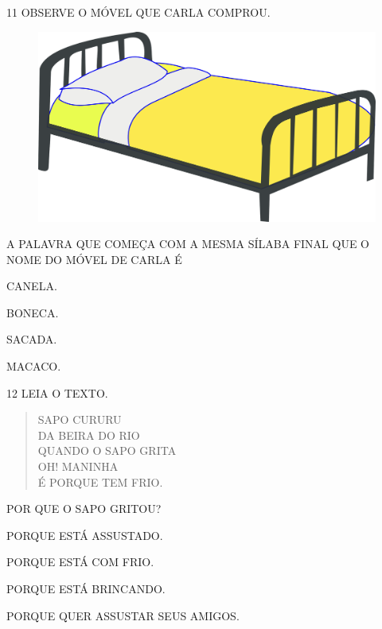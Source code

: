 
\num{11} OBSERVE O MÓVEL QUE CARLA COMPROU.

\begin{figure}[H]
\centering
\includegraphics[width=.65\textwidth]{media/image235a.png}
\end{figure}

A PALAVRA QUE COMEÇA COM A MESMA SÍLABA FINAL QUE O NOME DO MÓVEL DE CARLA É 

\begin{multicols}{2}
\begin{escolha}[itemsep=0pt]
\item CANELA.

\item BONECA.

\item SACADA.

\item MACACO.
\end{escolha}
\end{multicols}

\num{12} LEIA O TEXTO.

\begin{myquote}
\begin{verse}
SAPO CURURU\\
DA BEIRA DO RIO\\
QUANDO O SAPO GRITA\\
OH! MANINHA\\
É PORQUE TEM FRIO.
\end{verse}

\end{myquote}

POR QUE O SAPO GRITOU?

\begin{escolha}[itemsep=0pt]
\item PORQUE ESTÁ ASSUSTADO. 

\item PORQUE ESTÁ COM FRIO.

\item PORQUE ESTÁ BRINCANDO.

\item PORQUE QUER ASSUSTAR SEUS AMIGOS.
\end{escolha}

